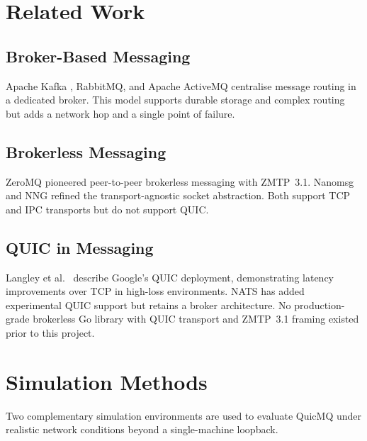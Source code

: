 \documentclass[12pt, a4paper, oneside]{report}
\begin{document}
\section{Related Work}
\label{sec:related}

\subsection{Broker-Based Messaging}
Apache Kafka \cite{kafka}, RabbitMQ, and Apache ActiveMQ centralise message routing in a dedicated broker. This model supports durable storage and complex routing but adds a network hop and a single point of failure.

\subsection{Brokerless Messaging}
ZeroMQ \cite{zmq} pioneered peer-to-peer brokerless messaging with ZMTP~3.1. Nanomsg \cite{nanomsg} and NNG refined the transport-agnostic socket abstraction. Both support TCP and IPC transports but do not support QUIC.

\subsection{QUIC in Messaging}
Langley et al.\ \cite{langley2017quic} describe Google's QUIC deployment, demonstrating latency improvements over TCP in high-loss environments. NATS \cite{nats} has added experimental QUIC support but retains a broker architecture. No production-grade brokerless Go library with QUIC transport and ZMTP~3.1 framing existed prior to this project.

\section{Simulation Methods}
\label{sec:sim-methods}

Two complementary simulation environments are used to evaluate QuicMQ under realistic network conditions beyond a single-machine loopback.
\end{document}
